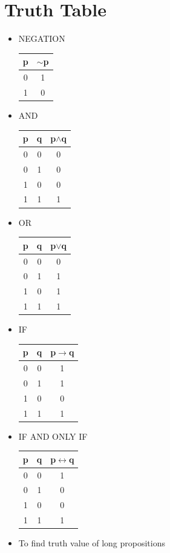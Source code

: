 \documentclass[a4paper,oneside]{book}
\begin{document}
\section{Truth Table}
\begin{multicols}{2}
\begin{itemize}
  \item NEGATION \begin{tabular}[H]{c|c}
p & $\sim$p \\ \hline
0 & 1 \\
1 & 0 \\ 
\end{tabular}
\item AND \begin{tabular}[H]{c|c|c}
p & q & p$\wedge$q \\ \hline
0 & 0 & 0 \\
0 & 1 & 0 \\
1 & 0 & 0 \\
1 & 1 & 1 \\
\end{tabular}
\item OR \begin{tabular}[H]{c|c|c}
p & q & p$\lor$q \\ \hline
0 & 0 & 0 \\
0 & 1 & 1 \\
1 & 0 & 1 \\
1 & 1 & 1 \\
\end{tabular}
\item IF \begin{tabular}[H]{c|c|c}
p & q & p$\to$q \\ \hline
0 & 0 & 1 \\
0 & 1 & 1 \\
1 & 0 & 0 \\
1 & 1 & 1 \\
\end{tabular}
\item IF AND ONLY IF \begin{tabular}[H]{c|c|c}
p & q & p$\leftrightarrow$q \\ \hline
0 & 0 & 1 \\
0 & 1 & 0 \\
1 & 0 & 0 \\
1 & 1 & 1 \\
\end{tabular}
\item To find truth value of long propositions \setlength{\tabcolsep}{1pt}
\begin{tabular}[H]{ccccccccccc}

\end{tabular}
\end{itemize}
\end{multicols}
\end{document}
